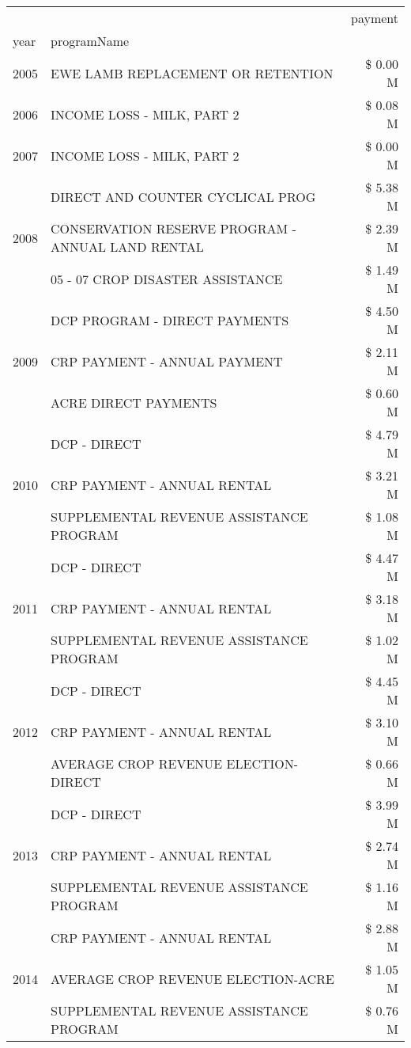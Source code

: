 \begin{tabular}{llr}
\toprule
 &  & payment \\
year & programName &  \\
\midrule
2005 & EWE LAMB REPLACEMENT OR RETENTION & \$ 0.00 M \\
\cline{1-3}
2006 & INCOME LOSS - MILK, PART 2 & \$ 0.08 M \\
\cline{1-3}
2007 & INCOME LOSS - MILK, PART 2 & \$ 0.00 M \\
\cline{1-3}
\multirow[t]{3}{*}{2008} & DIRECT AND COUNTER CYCLICAL PROG & \$ 5.38 M \\
 & CONSERVATION RESERVE PROGRAM - ANNUAL LAND RENTAL & \$ 2.39 M \\
 & 05 - 07 CROP DISASTER ASSISTANCE & \$ 1.49 M \\
\cline{1-3}
\multirow[t]{3}{*}{2009} & DCP PROGRAM - DIRECT PAYMENTS & \$ 4.50 M \\
 & CRP PAYMENT - ANNUAL PAYMENT & \$ 2.11 M \\
 & ACRE DIRECT PAYMENTS & \$ 0.60 M \\
\cline{1-3}
\multirow[t]{3}{*}{2010} & DCP - DIRECT & \$ 4.79 M \\
 & CRP PAYMENT - ANNUAL RENTAL & \$ 3.21 M \\
 & SUPPLEMENTAL REVENUE ASSISTANCE PROGRAM & \$ 1.08 M \\
\cline{1-3}
\multirow[t]{3}{*}{2011} & DCP - DIRECT & \$ 4.47 M \\
 & CRP PAYMENT - ANNUAL RENTAL & \$ 3.18 M \\
 & SUPPLEMENTAL REVENUE ASSISTANCE PROGRAM & \$ 1.02 M \\
\cline{1-3}
\multirow[t]{3}{*}{2012} & DCP - DIRECT & \$ 4.45 M \\
 & CRP PAYMENT - ANNUAL RENTAL & \$ 3.10 M \\
 & AVERAGE CROP REVENUE ELECTION-DIRECT & \$ 0.66 M \\
\cline{1-3}
\multirow[t]{3}{*}{2013} & DCP - DIRECT & \$ 3.99 M \\
 & CRP PAYMENT - ANNUAL RENTAL & \$ 2.74 M \\
 & SUPPLEMENTAL REVENUE ASSISTANCE PROGRAM & \$ 1.16 M \\
\cline{1-3}
\multirow[t]{3}{*}{2014} & CRP PAYMENT - ANNUAL RENTAL & \$ 2.88 M \\
 & AVERAGE CROP REVENUE ELECTION-ACRE & \$ 1.05 M \\
 & SUPPLEMENTAL REVENUE ASSISTANCE PROGRAM & \$ 0.76 M \\
\cline{1-3}

\end{tabular}

